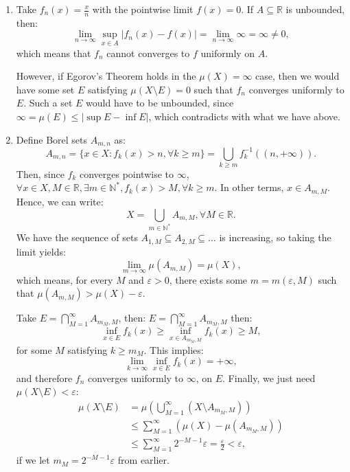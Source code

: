 \begin{enumerate}[label=\textbf{2E.\arabic*}]
\item Take \( f_{n}(x) = \frac{x}{n} \) with the pointwise limit \( f(x) = 0 \).
  If \( A \subseteq \mathbb{R} \) is unbounded, then:
  \[
    \lim_{n \to \infty} \sup_{x \in A} |f_{n}(x) - f(x)| = \lim_{n \to \infty}
    \infty = \infty \neq 0
  ,\] which means that \( f_{n} \) cannot converges to \( f \) uniformly on \( A
  \).

  However, if Egorov's Theorem holds in the \( \mu (X) = \infty \) case, then we
  would have some set \( E \) satisfying \( \mu (X \setminus E) = 0 \) such that
  \( f_{n} \) converges uniformly to \( E \). Such a set \( E \) would have to
  be unbounded, since \( \infty = \mu (E) \le  |\sup E - \inf E| \), which
  contradicts with what we have above.
\item Define Borel sets \( A_{m, n} \) as:
  \[
    A_{m, n} = \{x \in X: f_{k}(x) > n, \forall k \ge m\} = \bigcup_{k \ge m}
    f_{k}^{-1}((n, +\infty))
  .\] 
  Then, since \( f_{k} \) converges pointwise to \( \infty \), \( \forall x \in
  X, M \in \mathbb{R}, \exists m \in \mathbb{N}^{*}, f_{k}(x) > M, \forall k \ge
  m\). In other terms, \( x \in A_{m, M} \). Hence, we can write:
  \[
    X = \bigcup_{m \in \mathbb{N}^{*}} A_{m, M}, \forall M \in \mathbb{R}
  .\] 
  We have the sequence of sets \( A_{1, M} \subseteq A_{2, M} \subseteq \ldots
  \) is increasing, so taking the limit yields:
  \[
    \lim_{m \to \infty} \mu (A_{m, M}) = \mu (X)
  ,\] which means, for every \( M \) and \( \varepsilon > 0 \),
  there exists some \( m = m(\varepsilon, M) \) such that \(
  \mu (A_{m, M}) > \mu (X) - \varepsilon\).

  Take \( E = \bigcap_{M = 1}^{\infty} A_{m_{M}, M} \), then:
  \( E = \bigcap_{M = 1}^{\infty} A_{m_{M}, M} \) then:
  \[
    \inf_{x \in E} f_{k}(x) \ge \inf_{x \in A_{m_{M}, M}} f_{k}(x) \ge M
  ,\] for some \( M \) satisfying \( k \ge m_{M} \). This implies:
  \[
    \lim_{k \to \infty} \inf_{x \in E} f_{k}(x) = +\infty
  ,\] and therefore \( f_{n} \) converges uniformly to \( \infty \), on \( E \).
  Finally, we just need \( \mu (X \setminus E) < \varepsilon \):
  \begin{align*}
    \mu (X \setminus E) &= \mu \left( \bigcup_{M = 1}^{\infty} (X \setminus
    A_{m_{M}, M}) \right)  \\
                        &\le \sum_{M = 1}^{\infty} (\mu (X) - \mu (A_{m_{M},
                        M}))\\
                        &\le  \sum_{M = 1}^{\infty} 2^{-M - 1}\varepsilon =
                        \frac{\varepsilon}{2} < \varepsilon
  ,\end{align*} if we let \( m_{M} = 2^{-M-1}\varepsilon \) from earlier.


\end{enumerate}
